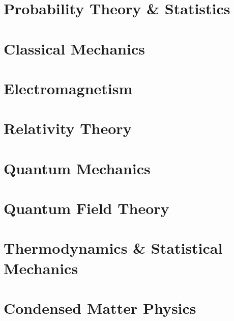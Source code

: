 \documentclass[11pt, a4paper]{report}
\begin{document}
\part{Probability Theory \& Statistics}





%

\part{Classical Mechanics}





\part{Electromagnetism}



\part{Relativity Theory}


\part{Quantum Mechanics}








\part{Quantum Field Theory}



%





\part{Thermodynamics \& Statistical Mechanics}



\part{Condensed Matter Physics}


\end{document}
